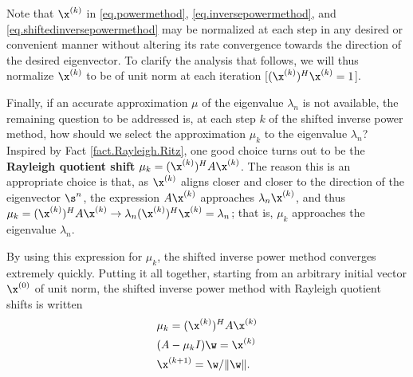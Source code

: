 \begin{figure*}[t]

\end{figure*}


Note that $\x^{(k)}$ in \eqref{eq.powermethod}, \eqref{eq.inversepowermethod}, and \eqref{eq.shiftedinversepowermethod} may be normalized at each step in any desired or convenient manner without
altering its rate convergence towards the direction of the desired eigenvector.  To clarify the analysis that follows, we will thus normalize
$\x^{(k)}$ to be of unit norm at each iteration [$(\x^{(k)})^H \x^{(k)}=1$].

Finally, if an accurate approximation $\mu$ of the eigenvalue $\lambda_{n}$ is not available, the remaining question to be addressed is,
at each step $k$ of the shifted inverse power method, how should we select the approximation $\mu_k$ to the eigenvalue $\lambda_{n}$?
Inspired by Fact \ref{fact.Rayleigh.Ritz}, one good choice turns out to be the {\bf Rayleigh quotient shift} $\mu_k = (\x^{(k)})^H A \x^{(k)}$.
The reason this is an appropriate choice is that, as $\x^{(k)}$ aligns closer and closer to the direction of the eigenvector $\s^n$, the expression $A \x^{(k)}$
approaches $\lambda_n \x^{(k)}$, and thus $\mu_k = (\x^{(k)})^H A \x^{(k)}\rightarrow \lambda_n (\x^{(k)})^H \x^{(k)} =  \lambda_n$; that is, $\mu_k$ approaches
the eigenvalue $\lambda_n$.  

By using this expression for $\mu_k$, the shifted inverse power method converges extremely quickly.
Putting it all together, starting from an arbitrary initial vector $\x^{(0)}$ of unit norm,
the shifted inverse power method with Rayleigh quotient shifts is written
\begin{equation}
\begin{aligned}
&\mu_k = (\x^{(k)})^H A \x^{(k)}  \\
&(A-\mu_k I)\w=\x^{(k)} \\
&\x^{(k+1)}=\w/\Vert \w \Vert.
\end{aligned}
\label{shiftedinversepower}
\end{equation}
\clearpage


